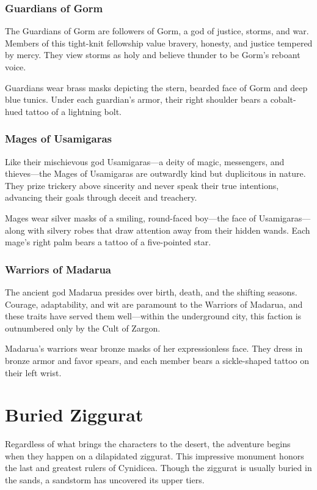 \documentclass[10pt,a4paper,twoside,bg=print,twocolumn,openany,nodeprecatedcode]{dndbook}
\begin{document}
\subsubsection{Guardians of Gorm}
The Guardians of Gorm are followers of Gorm, a god of justice, storms, and war. Members of this tight-knit fellowship value bravery, honesty, and justice tempered by mercy. They view storms as holy and believe thunder to be Gorm's reboant voice.

Guardians wear brass masks depicting the stern, bearded face of Gorm and deep blue tunics. Under each guardian's armor, their right shoulder bears a cobalt-hued tattoo of a lightning bolt.

\subsubsection{Mages of Usamigaras}
Like their mischievous god Usamigaras—a deity of magic, messengers, and thieves—the Mages of Usamigaras are outwardly kind but duplicitous in nature. They prize trickery above sincerity and never speak their true intentions, advancing their goals through deceit and treachery.

Mages wear silver masks of a smiling, round-faced boy—the face of Usamigaras—along with silvery robes that draw attention away from their hidden wands. Each mage's right palm bears a tattoo of a five-pointed star.

\subsubsection{Warriors of Madarua}
The ancient god Madarua presides over birth, death, and the shifting seasons. Courage, adaptability, and wit are paramount to the Warriors of Madarua, and these traits have served them well—within the underground city, this faction is outnumbered only by the Cult of Zargon.

Madarua's warriors wear bronze masks of her expressionless face. They dress in bronze armor and favor spears, and each member bears a sickle-shaped tattoo on their left wrist.

\section{Buried Ziggurat}
Regardless of what brings the characters to the desert, the adventure begins when they happen on a dilapidated ziggurat. This impressive monument honors the last and greatest rulers of Cynidicea. Though the ziggurat is usually buried in the sands, a sandstorm has uncovered its upper tiers.
\end{document}
